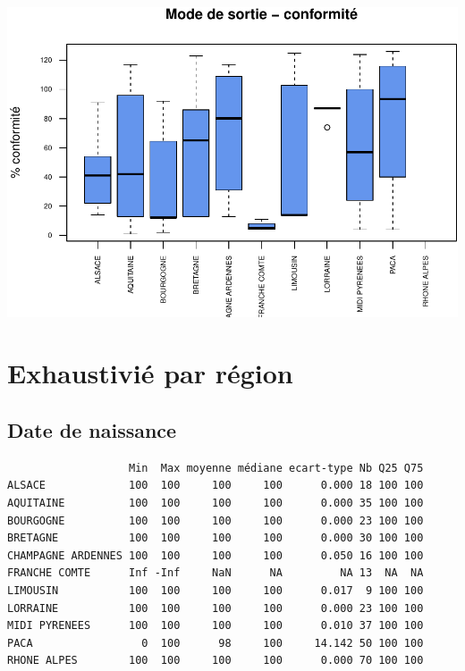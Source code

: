 \documentclass[]{article}
\begin{document}
\includegraphics{septembre2015_files/figure-latex/unnamed-chunk-31-1.pdf}

\section{Exhaustivié par région}\label{exhaustivie-par-region}

\subsection{Date de naissance}\label{date-de-naissance-2}

\begin{verbatim}
                   Min  Max moyenne médiane ecart-type Nb Q25 Q75
ALSACE             100  100     100     100      0.000 18 100 100
AQUITAINE          100  100     100     100      0.000 35 100 100
BOURGOGNE          100  100     100     100      0.000 23 100 100
BRETAGNE           100  100     100     100      0.000 30 100 100
CHAMPAGNE ARDENNES 100  100     100     100      0.050 16 100 100
FRANCHE COMTE      Inf -Inf     NaN      NA         NA 13  NA  NA
LIMOUSIN           100  100     100     100      0.017  9 100 100
LORRAINE           100  100     100     100      0.000 23 100 100
MIDI PYRENEES      100  100     100     100      0.010 37 100 100
PACA                 0  100      98     100     14.142 50 100 100
RHONE ALPES        100  100     100     100      0.000 70 100 100
\end{verbatim}
\end{document}
